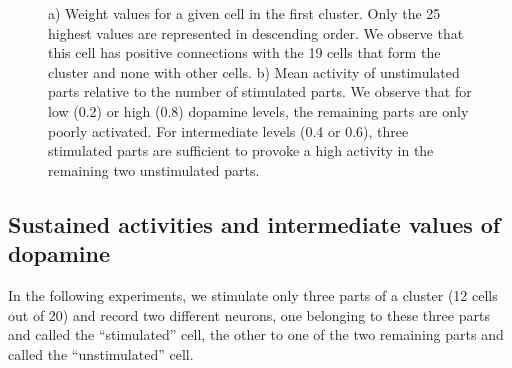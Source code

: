 \documentclass[
  11pt,
  a4paper,
]{scrbook}
\begin{document}
\begin{figure}


\caption{\label{fig-jocn:progressive}a) Weight values for a given cell
in the first cluster. Only the 25 highest values are represented in
descending order. We observe that this cell has positive connections
with the 19 cells that form the cluster and none with other cells. b)
Mean activity of unstimulated parts relative to the number of stimulated
parts. We observe that for low (0.2) or high (0.8) dopamine levels, the
remaining parts are only poorly activated. For intermediate levels (0.4
or 0.6), three stimulated parts are sufficient to provoke a high
activity in the remaining two unstimulated parts.}

\end{figure}%

\subsection{Sustained activities and intermediate values of
dopamine}\label{sustained-activities-and-intermediate-values-of-dopamine}

In the following experiments, we stimulate only three parts of a cluster
(12 cells out of 20) and record two different neurons, one belonging to
these three parts and called the ``stimulated'' cell, the other to one
of the two remaining parts and called the ``unstimulated'' cell.
\end{document}
